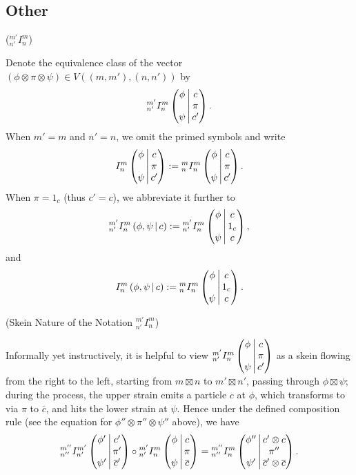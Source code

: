  
 
 
\subsection{Other}
   
    
\begin{notation} (${}^{m'}_{n'}I^{m}_{n}$)

  \noindent Denote the equivalence class of the vector
  $(\phi \otimes \pi \otimes \psi) \in V((m,m'),(n,n'))$ by
  \[\III{m'}{n'}{m}{n}{\phi}{\psi}{c}{\pi}{c'}.\]
  When $m' = m$ and $n' = n$, we omit the primed symbols and write
  \[
    \III{}{}{m}{n}{\phi}{\psi}{c}{\pi}{c'} :=
    \III{m}{n}{m}{n}{\phi}{\psi}{c}{\pi}{c'}.
  \]
  When $\pi = 1_{c}$ (thus $c' = c$), we abbreviate it further to
  \[
    \II{m'}{n'}{m}{n}{\phi}{\psi}{c} :=
    \III{m'}{n'}{m}{n}{\phi}{\psi}{c}{1_{c}}{c},
  \]
  and
  \[
    \II{}{}{m}{n}{\phi}{\psi}{c} :=
    \III{m}{n}{m}{n}{\phi}{\psi}{c}{1_{c}}{c}.
  \]
\end{notation}

\begin{remark}\label{remark/skein-nature-of-the-notation-I} (Skein Nature of the Notation ${}^{m'}_{n'}I^{m}_{n}$)

  \noindent Informally yet instructively, it is helpful to view
  $\III{m'}{n'}{m}{n}{\phi}{\psi}{c}{\pi}{c'}$ as a skein flowing from the right to
  the left, starting from $m \boxtimes n$ to $m' \boxtimes n'$, passing through $\phi \boxtimes \psi$;
  during the process, the upper strain emits a particle $c$ at $\phi$, which
  transforms to via $\pi$ to $\overline{c}$, and hits the lower strain at
  $\psi$. Hence under the defined composition rule (see the equation for
  $\phi'' \otimes \pi'' \otimes \psi''$ above), we have
  \[
    \III{m''}{n''}{m'}{n'}{\phi'}{\psi'}{c'}{\pi'}{\overline{c}'} \circ
    \III{m'}{n'}{m}{n}{\phi}{\psi}{c}{\pi}{\overline{c}} =
    \III{m''}{n''}{m}{n}{\phi''}{\psi'}{c' \otimes c}{\pi''}{\overline{c}' \otimes \overline{c}}.
  \]
\end{remark}

